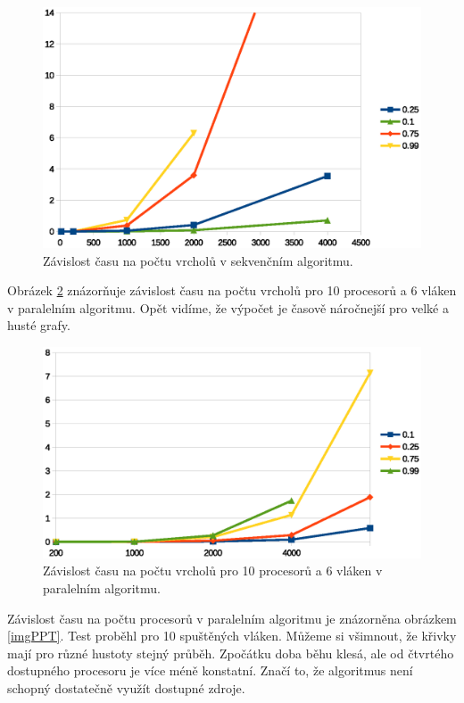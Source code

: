 \documentclass[a4paper, 11pt, titlepage, final]{article}[3. prosinec 2011]
\begin{document}
\begin{figure}[ht]
  \centering
  \includegraphics[scale=0.8]{img/sequence_n_time.eps}
  \caption{Závislost času na počtu vrcholů v sekvenčním algoritmu.}
  \label{imgSNT}
\end{figure}

Obrázek \ref{imgPNT} znázorňuje závislost času na počtu vrcholů pro 10 procesorů a 6 vláken v paralelním algoritmu. Opět vidíme, že výpočet je časově náročnejší pro velké a husté grafy.

\begin{figure}[ht]
  \centering
  \includegraphics[scale=0.8]{img/paral_n_time.eps}
  \caption{Závislost času na počtu vrcholů pro 10 procesorů a 6 vláken v paralelním algoritmu.}
  \label{imgPNT}
\end{figure}

Závislost času na počtu procesorů v paralelním algoritmu je znázorněna obrázkem \ref{imgPPT}. Test proběhl pro 10 spuštěných vláken. Můžeme si všimnout, že křivky mají pro různé hustoty stejný průběh. Zpočátku doba běhu klesá, ale od čtvrtého dostupného procesoru je více méně konstatní. Značí to, že algoritmus není schopný dostatečně využít dostupné zdroje.
\end{document}
